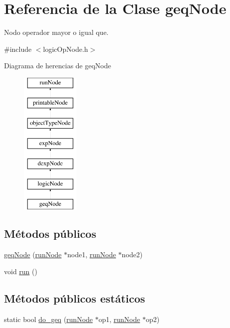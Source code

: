 \hypertarget{classgeqNode}{\section{Referencia de la Clase geq\-Node}
\label{classgeqNode}
}


Nodo operador mayor o igual que.  




{\ttfamily \#include $<$logic\-Op\-Node.\-h$>$}

Diagrama de herencias de geq\-Node\begin{figure}[H]
\begin{center}
\leavevmode
\includegraphics[height=7.000000cm]{classgeqNode}
\end{center}
\end{figure}
\subsection*{Métodos públicos}
\begin{DoxyCompactItemize}
\item 
\hyperlink{classgeqNode_a24bc49ed3dced5ad95773035bc715209}{geq\-Node} (\hyperlink{classrunNode}{run\-Node} $\ast$node1, \hyperlink{classrunNode}{run\-Node} $\ast$node2)
\item 
void \hyperlink{classgeqNode_ad2bee104bed0c28534a3c3c8d8998436}{run} ()
\end{DoxyCompactItemize}
\subsection*{Métodos públicos estáticos}
\begin{DoxyCompactItemize}
\item 
static bool \hyperlink{classgeqNode_a18c5160eb87509152d0bc60b19b3f920}{do\-\_\-geq} (\hyperlink{classrunNode}{run\-Node} $\ast$op1, \hyperlink{classrunNode}{run\-Node} $\ast$op2)
\end{DoxyCompactItemize}
